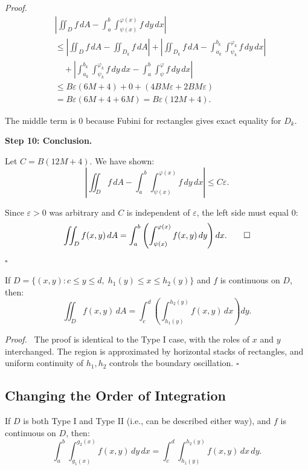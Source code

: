 \documentclass[11pt]{report}
\renewenvironment{proof}[1][Proof]{\par\noindent\textit{#1.}\ }{\hfill$\square$\par\medskip}
\begin{document}
\begin{proof}
\begin{align*}
&\left| \iint_D f \, dA - \int_a^b \int_{\psi(x)}^{\varphi(x)} f \, dy \, dx \right| \\
&\leq \left| \iint_D f \, dA - \iint_{D_k} f \, dA \right| + \left| \iint_{D_k} f \, dA - \int_{a_k}^{b_k} \int_{\psi_k}^{\varphi_k} f \, dy \, dx \right| \\
&\quad + \left| \int_{a_k}^{b_k} \int_{\psi_k}^{\varphi_k} f \, dy \, dx - \int_a^b \int_{\psi}^{\varphi} f \, dy \, dx \right| \\
&\leq B\varepsilon(6M + 4) + 0 + (4BM\varepsilon + 2BM\varepsilon) \\
&= B\varepsilon(6M + 4 + 6M) = B\varepsilon(12M + 4).
\end{align*}

The middle term is $0$ because Fubini for rectangles gives exact equality for $D_k$.

\textbf{Step 10: Conclusion.}

Let $C = B(12M + 4)$. We have shown:
\[
\left| \iint_D f \, dA - \int_a^b \int_{\psi(x)}^{\varphi(x)} f \, dy \, dx \right| \leq C\varepsilon.
\]

Since $\varepsilon > 0$ was arbitrary and $C$ is independent of $\varepsilon$, the left side must equal $0$:
\[
\iint_D f(x, y) \, dA = \int_a^b \left( \int_{\psi(x)}^{\varphi(x)} f(x, y) \, dy \right) dx. \qedhere
\]
\end{proof}

\begin{theorem}
If $D = \{(x, y) : c \leq y \leq d, \; h_1(y) \leq x \leq h_2(y)\}$ and $f$ is continuous on $D$, then:
\[
\iint_D f(x, y) \, dA = \int_c^d \left( \int_{h_1(y)}^{h_2(y)} f(x, y) \, dx \right) dy.
\]
\end{theorem}

\begin{proof}
The proof is identical to the Type I case, with the roles of $x$ and $y$ interchanged. The region is approximated by horizontal stacks of rectangles, and uniform continuity of $h_1, h_2$ controls the boundary oscillation.
\end{proof}

\subsection*{Changing the Order of Integration}

\begin{corollary}
If $D$ is both Type I and Type II (i.e., can be described either way), and $f$ is continuous on $D$, then:
\[
\int_a^b \int_{g_1(x)}^{g_2(x)} f(x, y) \, dy \, dx = \int_c^d \int_{h_1(y)}^{h_2(y)} f(x, y) \, dx \, dy.
\]
\end{corollary}
\end{document}
